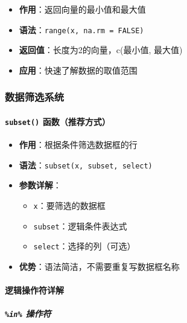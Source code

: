 \documentclass[
  twoside]{book}
\providecommand{\tightlist}{%
  \setlength{\itemsep}{0pt}\setlength{\parskip}{0pt}}
\begin{document}
\begin{itemize}
\tightlist
\item
  \textbf{作用}：返回向量的最小值和最大值
\item
  \textbf{语法}：\texttt{range(x,\ na.rm\ =\ FALSE)}
\item
  \textbf{返回值}：长度为2的向量，c(最小值, 最大值)
\item
  \textbf{应用}：快速了解数据的取值范围
\end{itemize}

\hypertarget{ux6570ux636eux7b5bux9009ux7cfbux7edf}{%
\subsubsection{数据筛选系统}\label{ux6570ux636eux7b5bux9009ux7cfbux7edf}}

\hypertarget{subset-ux51fdux6570ux63a8ux8350ux65b9ux5f0f}{%
\paragraph{\texorpdfstring{\texttt{subset()} 函数（推荐方式）}{subset() 函数（推荐方式）}}\label{subset-ux51fdux6570ux63a8ux8350ux65b9ux5f0f}}

\begin{itemize}
\tightlist
\item
  \textbf{作用}：根据条件筛选数据框的行
\item
  \textbf{语法}：\texttt{subset(x,\ subset,\ select)}
\item
  \textbf{参数详解}：

  \begin{itemize}
  \tightlist
  \item
    \texttt{x}：要筛选的数据框
  \item
    \texttt{subset}：逻辑条件表达式
  \item
    \texttt{select}：选择的列（可选）
  \end{itemize}
\item
  \textbf{优势}：语法简洁，不需要重复写数据框名称
\end{itemize}

\hypertarget{ux903bux8f91ux64cdux4f5cux7b26ux8be6ux89e3}{%
\paragraph{逻辑操作符详解}\label{ux903bux8f91ux64cdux4f5cux7b26ux8be6ux89e3}}

\hypertarget{in-ux64cdux4f5cux7b26}{%
\subparagraph{\texorpdfstring{\texttt{\%in\%} 操作符}{\%in\% 操作符}}\label{in-ux64cdux4f5cux7b26}}
\end{document}
